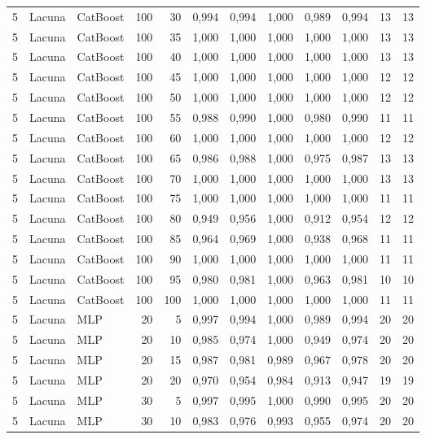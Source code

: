 \begin{longtable}{@{}rllrrrrrrrrr@{}}
5 & Lacuna & CatBoost & 100 & 30 & 0,994 & 0,994 & 1,000 & 0,989 & 0,994 & 13 & 13 \\
5 & Lacuna & CatBoost & 100 & 35 & 1,000 & 1,000 & 1,000 & 1,000 & 1,000 & 13 & 13 \\
5 & Lacuna & CatBoost & 100 & 40 & 1,000 & 1,000 & 1,000 & 1,000 & 1,000 & 13 & 13 \\
5 & Lacuna & CatBoost & 100 & 45 & 1,000 & 1,000 & 1,000 & 1,000 & 1,000 & 12 & 12 \\
5 & Lacuna & CatBoost & 100 & 50 & 1,000 & 1,000 & 1,000 & 1,000 & 1,000 & 12 & 12 \\
5 & Lacuna & CatBoost & 100 & 55 & 0,988 & 0,990 & 1,000 & 0,980 & 0,990 & 11 & 11 \\
5 & Lacuna & CatBoost & 100 & 60 & 1,000 & 1,000 & 1,000 & 1,000 & 1,000 & 12 & 12 \\
5 & Lacuna & CatBoost & 100 & 65 & 0,986 & 0,988 & 1,000 & 0,975 & 0,987 & 13 & 13 \\
5 & Lacuna & CatBoost & 100 & 70 & 1,000 & 1,000 & 1,000 & 1,000 & 1,000 & 13 & 13 \\
5 & Lacuna & CatBoost & 100 & 75 & 1,000 & 1,000 & 1,000 & 1,000 & 1,000 & 11 & 11 \\
5 & Lacuna & CatBoost & 100 & 80 & 0,949 & 0,956 & 1,000 & 0,912 & 0,954 & 12 & 12 \\
5 & Lacuna & CatBoost & 100 & 85 & 0,964 & 0,969 & 1,000 & 0,938 & 0,968 & 11 & 11 \\
5 & Lacuna & CatBoost & 100 & 90 & 1,000 & 1,000 & 1,000 & 1,000 & 1,000 & 11 & 11 \\
5 & Lacuna & CatBoost & 100 & 95 & 0,980 & 0,981 & 1,000 & 0,963 & 0,981 & 10 & 10 \\
5 & Lacuna & CatBoost & 100 & 100 & 1,000 & 1,000 & 1,000 & 1,000 & 1,000 & 11 & 11 \\
5 & Lacuna & MLP & 20 & 5 & 0,997 & 0,994 & 1,000 & 0,989 & 0,994 & 20 & 20 \\
5 & Lacuna & MLP & 20 & 10 & 0,985 & 0,974 & 1,000 & 0,949 & 0,974 & 20 & 20 \\
5 & Lacuna & MLP & 20 & 15 & 0,987 & 0,981 & 0,989 & 0,967 & 0,978 & 20 & 20 \\
5 & Lacuna & MLP & 20 & 20 & 0,970 & 0,954 & 0,984 & 0,913 & 0,947 & 19 & 19 \\
5 & Lacuna & MLP & 30 & 5 & 0,997 & 0,995 & 1,000 & 0,990 & 0,995 & 20 & 20 \\
5 & Lacuna & MLP & 30 & 10 & 0,983 & 0,976 & 0,993 & 0,955 & 0,974 & 20 & 20 \\

\end{longtable}
